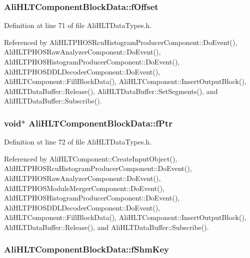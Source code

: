 \subsubsection{ {\bf Ali\-HLTComponent\-Block\-Data::f\-Offset}}\label{structAliHLTComponentBlockData_o2}




Definition at line 71 of file Ali\-HLTData\-Types.h.

Referenced by Ali\-HLTPHOSRcu\-Histogram\-Producer\-Component::Do\-Event(), Ali\-HLTPHOSRaw\-Analyzer\-Component::Do\-Event(), Ali\-HLTPHOSHistogram\-Producer\-Component::Do\-Event(), Ali\-HLTPHOSDDLDecoder\-Component::Do\-Event(), Ali\-HLTComponent::Fill\-Block\-Data(), Ali\-HLTComponent::Insert\-Output\-Block(), Ali\-HLTData\-Buffer::Release(), Ali\-HLTData\-Buffer::Set\-Segments(), and Ali\-HLTData\-Buffer::Subscribe().
\subsubsection{\setlength{\rightskip}{0pt plus 5cm}void$\ast$ {\bf Ali\-HLTComponent\-Block\-Data::f\-Ptr}}\label{structAliHLTComponentBlockData_o3}




Definition at line 72 of file Ali\-HLTData\-Types.h.

Referenced by Ali\-HLTComponent::Create\-Input\-Object(), Ali\-HLTPHOSRcu\-Histogram\-Producer\-Component::Do\-Event(), Ali\-HLTPHOSRaw\-Analyzer\-Component::Do\-Event(), Ali\-HLTPHOSModule\-Merger\-Component::Do\-Event(), Ali\-HLTPHOSHistogram\-Producer\-Component::Do\-Event(), Ali\-HLTPHOSDDLDecoder\-Component::Do\-Event(), Ali\-HLTComponent::Fill\-Block\-Data(), Ali\-HLTComponent::Insert\-Output\-Block(), Ali\-HLTData\-Buffer::Release(), and Ali\-HLTData\-Buffer::Subscribe().
\subsubsection{ {\bf Ali\-HLTComponent\-Block\-Data::f\-Shm\-Key}}\label{structAliHLTComponentBlockData_o1}




